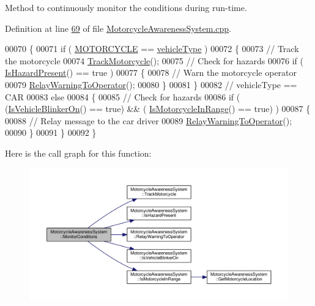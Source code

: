 Method to continuously monitor the conditions during run-\/time. 



Definition at line \hyperlink{MotorcycleAwarenessSystem_8cpp_source_l00069}{69} of file \hyperlink{MotorcycleAwarenessSystem_8cpp_source}{Motorcycle\-Awareness\-System.\-cpp}.


\begin{DoxyCode}
00070 \{
00071     \textcolor{keywordflow}{if} ( \hyperlink{MotorcycleAwarenessSystemTypes_8hpp_a0c05c42b98a847f971385c81c2a81afaa39b983b1f7acfc4e7c900d77b0fded6a}{MOTORCYCLE} == \hyperlink{classMotorcycleAwarenessSystem_a977b2085bfbf6a62902bf2d80160e6d2}{vehicleType} )
00072     \{
00073         \textcolor{comment}{// Track the motorcycle}
00074         \hyperlink{classMotorcycleAwarenessSystem_a4e6eec23ec46e24ee377a3c94e15eba4}{TrackMotorcycle}();
00075         \textcolor{comment}{// Check for hazards}
00076         \textcolor{keywordflow}{if} ( \hyperlink{classMotorcycleAwarenessSystem_a35d59c8299b0d5ef43c10306cc7f2ee1}{IsHazardPresent}() == \textcolor{keyword}{true} )
00077         \{
00078             \textcolor{comment}{// Warn the motorcycle operator}
00079             \hyperlink{classMotorcycleAwarenessSystem_aec5e4731c6bf0789821ba2793918e3ee}{RelayWarningToOperator}();
00080         \}
00081     \}
00082     \textcolor{comment}{// vehicleType == CAR}
00083     \textcolor{keywordflow}{else}
00084     \{
00085         \textcolor{comment}{// Check for hazards}
00086         \textcolor{keywordflow}{if} ( (\hyperlink{classMotorcycleAwarenessSystem_a9c3f98a014b0af39fa120f478eb5f348}{IsVehicleBlinkerOn}() == \textcolor{keyword}{true}) && (
      \hyperlink{classMotorcycleAwarenessSystem_a239655aca9c875b1dbbad3ce155c7892}{IsMotorcycleInRange}() == \textcolor{keyword}{true}) )
00087         \{
00088             \textcolor{comment}{// Relay message to the car driver}
00089             \hyperlink{classMotorcycleAwarenessSystem_aec5e4731c6bf0789821ba2793918e3ee}{RelayWarningToOperator}();
00090         \}
00091     \}
00092 \}
\end{DoxyCode}


Here is the call graph for this function\-:\nopagebreak
\begin{figure}[H]
\begin{center}
\leavevmode
\includegraphics[width=350pt]{classMotorcycleAwarenessSystem_afb19e832c17d43941d9ed6c4f4435a2e_cgraph}
\end{center}
\end{figure}




